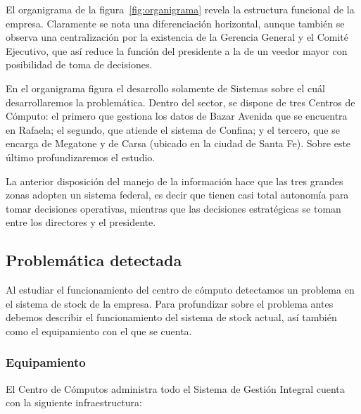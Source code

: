 
El organigrama de la figura~\ref{fig:organigrama} revela la estructura
funcional de la empresa.  Claramente se nota una diferenciación horizontal,
aunque también se observa una centralización  por la existencia de la Gerencia
General y el Comité Ejecutivo, que así reduce la función del presidente a la de
un veedor mayor con posibilidad de toma de decisiones.

En el organigrama figura el desarrollo solamente de Sistemas sobre el cuál
desarrollaremos la problemática. Dentro del sector, se dispone de tres Centros
de Cómputo: el primero que gestiona los datos de Bazar Avenida que se encuentra
en Rafaela; el segundo, que atiende el sistema de Confina; y el tercero, que se
encarga de Megatone y de Carsa (ubicado en la ciudad de Santa Fe). Sobre este
último profundizaremos el estudio.

La anterior disposición del manejo de la información hace que las tres grandes
zonas adopten un sistema federal, es decir que tienen casi total autonomía para
tomar decisiones operativas, mientras que las decisiones estratégicas se toman
entre los directores y el presidente.


\subsection{Problemática detectada}

Al estudiar el funcionamiento del centro de cómputo detectamos un problema en
el sistema de stock de la empresa. Para profundizar sobre el problema antes
debemos describir el funcionamiento del sistema de stock actual, así también
como el equipamiento con el que se cuenta.


\subsubsection{Equipamiento}

El Centro de Cómputos administra todo el Sistema de Gestión Integral cuenta con
la siguiente infraestructura:

